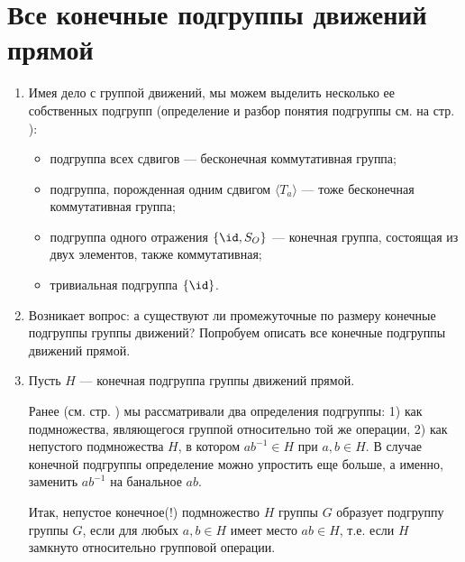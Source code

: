 \section{Все конечные подгруппы движений прямой}




\begin{enumerate}
\item Имея дело с группой движений, мы можем выделить несколько ее собственных подгрупп (определение и разбор понятия подгруппы см. на стр. \pageref{Subgroup}):
\begin{itemize}
\item подгруппа всех сдвигов --- бесконечная коммутативная группа;
\item подгруппа, порожденная одним сдвигом $\langle T_a\rangle$ --- тоже бесконечная коммутативная группа;
\item подгруппа одного отражения $\{\id, S_O\}$ --- конечная группа, состоящая из двух элементов, также коммутативная;
\item тривиальная подгруппа $\{\id\}$.
\end{itemize}
\item Возникает вопрос: а существуют ли промежуточные по размеру конечные подгруппы группы движений? Попробуем описать все конечные подгруппы движений прямой.
\item Пусть $H$ --- конечная подгруппа группы движений прямой.

Ранее (см. стр.  \pageref{Subgroup}) мы рассматривали два определения подгруппы: 1) как подмножества, являющегося группой относительно той же операции, 2) как непустого подмножества $H$, в котором $ab^{-1}\in H$ при $a,b\in H$. В случае конечной подгруппы определение можно упростить еще больше, а именно, заменить $ab^{-1}$ на банальное $ab$.

Итак, непустое конечное(!) подмножество $H$ группы $G$ образует подгруппу группы $G$, если для любых $a,b\in H$ имеет место $ab\in H$, т.е. если $H$ замкнуто относительно групповой операции.


\end{enumerate}
